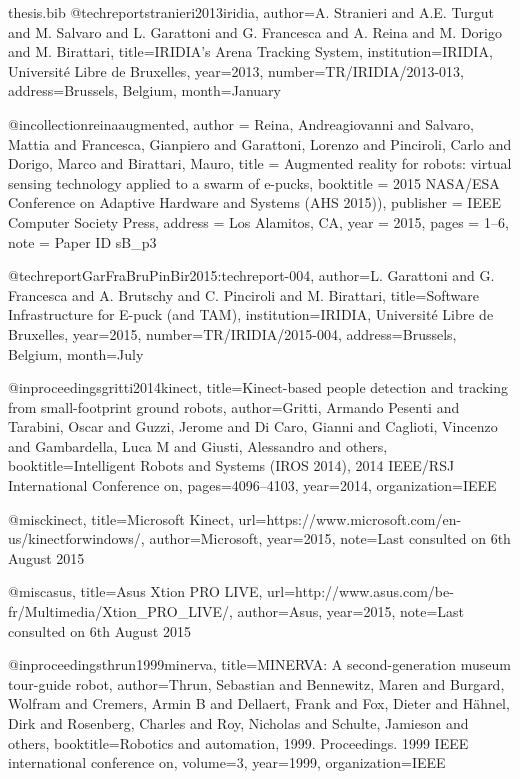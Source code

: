 \documentclass[oneside, a4paper, 12pt]{memoir}
\begin{document}
\begin{filecontents}{thesis.bib}
@techreport{stranieri2013iridia,
  author={A. Stranieri and A.E. Turgut and M. Salvaro and L. Garattoni and G. Francesca and A. Reina and M. Dorigo and  M. Birattari},
  title={IRIDIA's Arena Tracking System},
  institution={IRIDIA, Universit{\'e} Libre de Bruxelles},
  year={2013},
  number={TR/IRIDIA/2013-013},
  address={Brussels, Belgium},
  month={January}
}

@incollection{reinaaugmented,
  author = {Reina, Andreagiovanni and Salvaro, Mattia and Francesca, Gianpiero and Garattoni, Lorenzo and Pinciroli, Carlo and Dorigo, Marco and Birattari, Mauro},
  title = {Augmented reality for robots: virtual sensing technology applied to a swarm of e-pucks},
  booktitle = {2015 {NASA/ESA} Conference on Adaptive Hardware and Systems ({AHS 2015}))},
  publisher = {{IEEE} Computer Society Press},
  address = {Los Alamitos, CA},
  year = {2015},
  pages = {1--6},
  note = {Paper ID sB\_p3}
}

@techreport{GarFraBruPinBir2015:techreport-004,
 author={L. Garattoni and G. Francesca and A. Brutschy and C. Pinciroli and M. Birattari},
 title={Software Infrastructure for E-puck (and TAM)},
 institution={IRIDIA, Universit{\'e} Libre de Bruxelles},
 year={2015},
 number={TR/IRIDIA/2015-004},
 address={Brussels, Belgium},
 month={July}
}

@inproceedings{gritti2014kinect,
  title={Kinect-based people detection and tracking from small-footprint ground robots},
  author={Gritti, Armando Pesenti and Tarabini, Oscar and Guzzi, Jerome and Di Caro, Gianni and Caglioti, Vincenzo and Gambardella, Luca M and Giusti, Alessandro and others},
  booktitle={Intelligent Robots and Systems (IROS 2014), 2014 IEEE/RSJ International Conference on},
  pages={4096--4103},
  year={2014},
  organization={IEEE}
}

@misc{kinect,
	title={Microsoft Kinect},
	url={https://www.microsoft.com/en-us/kinectforwindows/},
	author={Microsoft},
	year={2015},
	note={Last consulted on 6th August 2015}
}

@misc{asus,
	title={Asus Xtion PRO LIVE},
	url={http://www.asus.com/be-fr/Multimedia/Xtion_PRO_LIVE/},
	author={Asus},
	year={2015},
	note={Last consulted on 6th August 2015}
}

@inproceedings{thrun1999minerva,
  title={MINERVA: A second-generation museum tour-guide robot},
  author={Thrun, Sebastian and Bennewitz, Maren and Burgard, Wolfram and Cremers, Armin B and Dellaert, Frank and Fox, Dieter and H{\"a}hnel, Dirk and Rosenberg, Charles and Roy, Nicholas and Schulte, Jamieson and others},
  booktitle={Robotics and automation, 1999. Proceedings. 1999 IEEE international conference on},
  volume={3},
  year={1999},
  organization={IEEE}
}


\end{filecontents}
\end{document}
